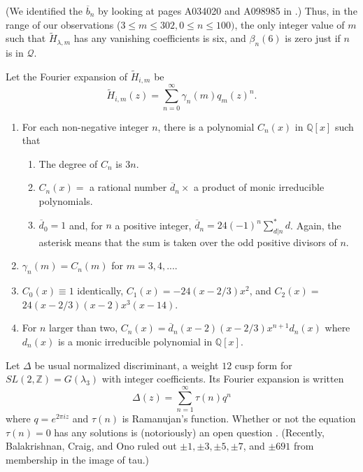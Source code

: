 \documentclass{article}
\begin{document}
\noindent
(We identified the $\overline{b}_n$ by looking at
pages A034020 and A098985 in \cite{OEIS}.)
\newline \newline \noindent
Thus, in the range of our observations
($3\leq m\leq 302, 0\leq n\leq 100)$,
the only integer value of $m$
such that
$\widetilde{H}_{\lambda,m}$ has any vanishing coefficients
is six, and $\beta_n(6)$ is zero just if
$n$ is in $\mathscr{Q}$. 
\begin{conjecture}
Let the Fourier expansion of $\widetilde{H}_{i,m}$ be
$$
\widetilde{H}_{i,m}(z) =
\sum_{n=0}^{\infty} \gamma_n(m) q_m(z)^n.
$$ 
\begin{enumerate}
\item For each non-negative integer $n$, there is a polynomial
$C_n(x)$ in $\mathbb{Q}[x]$ 
such that 
\begin{enumerate}
    \item The degree of $C_n$ is $3n$.
    \item $C_n(x) =$ a rational number 
    $\overline{d}_n \times$ a product of 
    monic irreducible polynomials.
    \item $\overline{d}_0 = 1$  and, for $n$ a positive
    integer, $\overline{d}_n = 24(-1)^n  \sum^*_{d|n} d$.
    Again, the asterisk means that the
    sum is taken over the odd positive divisors of $n$.
\end{enumerate} 
\item  $\gamma_n(m)=C_n(m)$  for  $m = 3,4, ....$
\item $C_0(x) \equiv 1$ identically,
$C_1(x)  = -24(x-2/3)x^2$, and
$C_2(x) = $ \newline $24(x-2/3)(x-2)x^3(x-14)$.
\item For $n$ larger than two,
$C_n(x) =\overline{d}_n (x-2)(x-2/3)x^{n+1} d_n(x)$
where $d_n(x)$ is a monic irreducible
polynomial in  $\mathbb{Q}[x]$.
\end{enumerate}
\end{conjecture}
\noindent
Let $\Delta$ be usual normalized discriminant,
 a weight $12$ cusp form
for $SL(2,\mathbb{Z}) =  G(\lambda_3)$
with integer coefficients.
Its Fourier expansion is written
$$
\Delta(z) = \sum_{n=1}^{\infty} \tau(n) q^n
$$
where $q = e^{2 \pi i z}$ and
 $\tau(n)$ is Ramanujan's function. 
Whether or not
the equation $\tau(n) = 0$ has 
any solutions is (notoriously) an open
question \cite{lehmer1947vanishing}.
(Recently, Balakrishnan, 
Craig, and Ono 
\cite{balakrishnan2020variations}
ruled out
$\pm 1, \pm 3, \pm 5,
\pm 7$, and $\pm 691$ from 
membership in the image of tau.)
\end{document}
